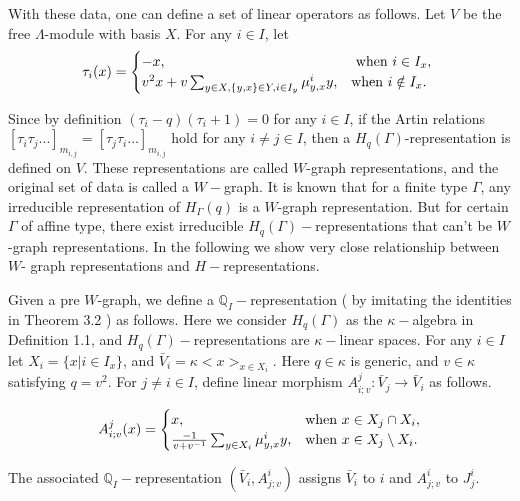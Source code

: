 \def\CTEXPreproc{Created by ctex v0.2.12, don't edit!}\documentclass[11pt]{article}
\begin{document}
    With these data, one can define a set of linear operators as follows. Let $V$ be the
   free $\Lambda$-module with basis $X$. For any $i\in I$, let
\[
\tau_i (x)= \begin{cases}
-x, &\text{ when $i\in I_x,$   }\\
v^2x+v\sum_{y\in X, \{y,x\} \in Y, i\in I_y }\mu^{i} _{y,x}y, &\text{when $ i\notin I_x$}.\\

\end{cases}
\]

 Since by definition $(\tau_i -q)(\tau_i +1)=0$ for any $i\in I$, if the Artin  relations $[\tau_i \tau_j ...   ]_{m_{i,j}}= [\tau_j \tau_i ...]_{m_{i,j}}  $ hold  for any $i\neq j\in I$, then a $H_{q}(\Gamma)$-representation is defined on $V$. These representations are called $W$-graph representations, and the original set of data is called a $W-$graph. It is known that for a finite type $\Gamma$, any irreducible representation of $H_{\Gamma}(q)$ is a $W$-graph representation. But for certain $\Gamma$ of affine type, there exist irreducible $H_{q}(\Gamma)- $representations that can't be $W$-graph representations.  In the following we show very close relationship between $W$- graph representations and $H-$representations.

 Given a pre $W$-graph, we define a $\mathbb{Q}_{I}-$representation ( by imitating the identities in Theorem 3.2 ) as follows. Here we consider $H_q (\Gamma)$ as the $\kappa-$algebra in Definition 1.1, and $H_q (\Gamma)-$representations are $\kappa-$linear spaces.  For any $i\in I$ let $X_i = \{ x | i\in I_x \} $, and $\bar{V}_i = \kappa < x   >_{x\in X_i }$. Here $q\in \kappa$ is generic, and $v\in \kappa $ satisfying $q=v^2$. For $j\neq i\in I$, define linear morphism $A^j _{i;v}: \bar{V}_j \rightarrow \bar{V}_i$ as follows.

\[
A^j _{i;v} (x )=\begin{cases}
x,   &\text{when $  x\in X_j \cap X_i $},\\
 \frac{-1}{v+ v^{-1}} \sum_{ y\in X_i  } \mu^{i}_{y,x} y, &\text{when $x\in X_j \setminus X_i $}.    \\

 \end{cases}
 \]

The associated $\mathbb{Q}_{I}-$representation $(\bar{V}_i , A^i _{j;v})$ assigns $\bar{V}_i$ to $i$ and $ A^i _{j;v} $ to $J^i _j$.

\end{document}
